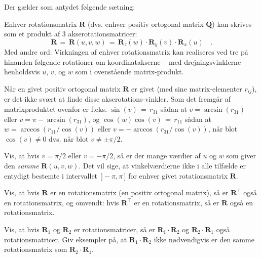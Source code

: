 Der gælder som antydet følgende sætning:

\begin{theorem} \label{thmAkseRotFactors}
Enhver rotationsmatrix $\mathbf{R}$ (dvs. enhver positiv ortogonal matrix $\mathbf{Q}$) kan skrives som et produkt af $3$ akserotationsmatricer:
\begin{equation}
\mathbf{R} \, = \, \mathbf{R}(u,v,w) \,= \, \mathbf{R}_{z}(w) \cdot \mathbf{R}_{y}(v) \cdot \mathbf{R}_{x}(u) \quad .
\end{equation}
Med andre ord: Virkningen af enhver rotationsmatrix kan
realiseres ved tre på hinanden følgende rotationer om koordinatakserne -- med drejningsvinklerne henholdsvis $u$, $v$, og $w$ som i ovenstående matrix-produkt.
\end{theorem}


\begin{aha}
Når en givet positiv ortogonal matrix $\mathbf{R}$ er givet (med sine matrix-elementer $r_{ij}$), er det  ikke svært at finde disse ak\-se\-ro\-ta\-tions-vinkler. Som det fremgår af matrixproduktet ovenfor er f.eks.
$\sin(v) \, = \, r_{31}$ sådan at $v = \arcsin(r_{31})$ eller $v = \pi - \arcsin(r_{31})$, og
$\cos(w)\cos(v) \, = \, r_{11}$ sådan at $w = \arccos(r_{11}/\cos(v))$ eller  $v = - \arccos(r_{31}/\cos(v))$, når blot $\cos(v) \neq 0$ dvs. når blot $v \neq \pm\pi/2$.\\
\end{aha}

\begin{exercise}
Vis, at hvis $v = \pi/2$ eller $v = -\pi/2$, så er der mange værdier af $u$ og $w$ som giver den {\em{samme}} $\mathbf{R}(u,v,w)$. Det vil sige, at vinkelværdierne ikke i alle tilfælde er
entydigt bestemte i intervallet $\,] -\pi, \pi\,]$ for enhver givet rotationsmatrix $\mathbf{R}$.\\
\end{exercise}

\begin{exercise}
Vis, at hvis $\mathbf{R}$ er en rotationsmatrix (en positiv ortogonal matrix), så er $\mathbf{R}^{\top}$ også en rotationsmatrix, og omvendt: hvis $\mathbf{R}^{\top}$ er en rotationsmatrix, så er $\mathbf{R}$ også en rotationsmatrix.
\end{exercise}


\begin{exercise}
Vis, at hvis $\mathbf{R}_{1}$ og $\mathbf{R}_{2}$ er rotationsmatricer, så er $\mathbf{R}_{1} \cdot \mathbf{R}_{2}$ og $\mathbf{R}_{2} \cdot \mathbf{R}_{1}$ også  rotationsmatricer. Giv eksempler på, at $\mathbf{R}_{1} \cdot \mathbf{R}_{2}$ ikke nødvendigvis er den samme rotationsmatrix som  $\mathbf{R}_{2} \cdot \mathbf{R}_{1}$.
\end{exercise}





